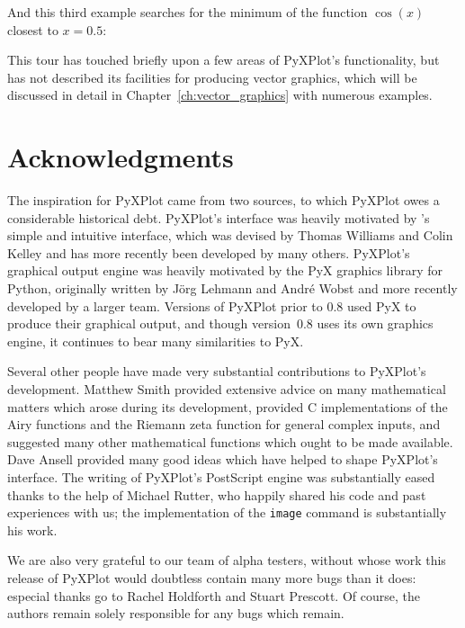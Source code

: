 \noindent And this third example searches for the minimum of the function $\cos(x)$ closest to $x=0.5$:

\vspace{3mm}
\newline
{}\newline
{}\newline
{}
\vspace{3mm}

This tour has touched briefly upon a few areas of PyXPlot's functionality, but
has not described its facilities for producing vector graphics, which will be
discussed in detail in Chapter~\ref{ch:vector_graphics} with numerous examples.

\section{Acknowledgments}

The inspiration for PyXPlot came from two sources, to which PyXPlot owes a
considerable historical debt.  PyXPlot's interface was heavily motivated by
\gnuplot's simple and intuitive interface, which was devised by Thomas Williams
and Colin Kelley and has more recently been developed by many others. PyXPlot's
graphical output engine was heavily motivated by the PyX graphics
library for Python, originally written by J\"org Lehmann and Andr\'e Wobst and
more recently developed by a larger team.  Versions of PyXPlot prior to $0.8$
used PyX to produce their graphical output, and though version~$0.8$ uses its
own graphics engine, it continues to bear many similarities to PyX.

Several other people have made very substantial contributions to PyXPlot's
development. Matthew Smith provided extensive advice on many mathematical
matters which arose during its development, provided C implementations of the
Airy functions and the Riemann zeta function for general complex inputs, and
suggested many other mathematical functions which ought to be made available.
Dave Ansell provided many good ideas which have helped to shape PyXPlot's
interface. The writing of PyXPlot's PostScript engine was substantially eased
thanks to the help of Michael Rutter, who happily shared his code and past
experiences with us; the implementation of the {\tt image} command is
substantially his work.

We are also very grateful to our team of alpha testers, without whose work this
release of PyXPlot would doubtless contain many more bugs than it does:
especial thanks go to Rachel Holdforth and Stuart Prescott. Of course, the
authors remain solely responsible for any bugs which remain.

